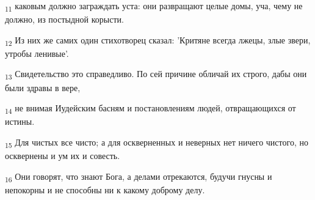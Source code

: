 \begin{tcolorbox}
\textsubscript{11} каковым должно заграждать уста: они развращают целые домы, уча, чему не должно, из постыдной корысти.
\end{tcolorbox}
\begin{tcolorbox}
\textsubscript{12} Из них же самих один стихотворец сказал: 'Критяне всегда лжецы, злые звери, утробы ленивые'.
\end{tcolorbox}
\begin{tcolorbox}
\textsubscript{13} Свидетельство это справедливо. По сей причине обличай их строго, дабы они были здравы в вере,
\end{tcolorbox}
\begin{tcolorbox}
\textsubscript{14} не внимая Иудейским басням и постановлениям людей, отвращающихся от истины.
\end{tcolorbox}
\begin{tcolorbox}
\textsubscript{15} Для чистых все чисто; а для оскверненных и неверных нет ничего чистого, но осквернены и ум их и совесть.
\end{tcolorbox}
\begin{tcolorbox}
\textsubscript{16} Они говорят, что знают Бога, а делами отрекаются, будучи гнусны и непокорны и не способны ни к какому доброму делу.
\end{tcolorbox}
